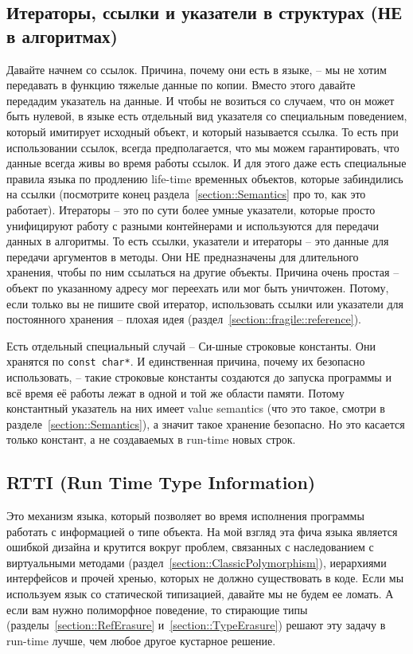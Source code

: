 \subsection{Итераторы, ссылки и указатели в структурах (НЕ в алгоритмах)}

Давайте начнем со ссылок.
Причина, почему они есть в языке, -- мы не хотим передавать в функцию тяжелые данные по копии.
Вместо этого давайте передадим указатель на данные.
И чтобы не возиться со случаем, что он может быть нулевой, в языке есть отдельный вид указателя со специальным поведением, который имитирует исходный объект, и который называется ссылка.
То есть при использовании ссылок, всегда предполагается, что мы можем гарантировать, что данные всегда живы во время работы ссылок.
И для этого даже есть специальные правила языка по продлению life-time временных объектов, которые забиндились на ссылки (посмотрите конец раздела~\ref{section::Semantics} про то, как это работает).
Итераторы -- это по сути более умные указатели, которые просто унифицируют работу с разными контейнерами и используются для передачи данных в алгоритмы.
То есть ссылки, указатели и итераторы -- это данные для передачи аргументов в методы.
Они НЕ предназначены для длительного хранения, чтобы по ним ссылаться на другие объекты.
Причина очень простая -- объект по указанному адресу мог переехать или мог быть уничтожен.
Потому, если только вы не пишите свой итератор, использовать ссылки или указатели для постоянного хранения -- плохая идея (раздел~\ref{section::fragile::reference}).

Есть отдельный специальный случай -- Си-шные строковые константы.
Они хранятся по \verb"const char*".
И единственная причина, почему их безопасно использовать, -- такие строковые константы создаются до запуска программы и всё время её работы лежат в одной и той же области памяти.
Потому константный указатель на них имеет value semantics (что это такое, смотри в разделе~\ref{section::Semantics}), а значит такое хранение безопасно.
Но это касается только констант, а не создаваемых в run-time новых строк.

\subsection{RTTI (Run Time Type Information)}

Это механизм языка, который позволяет во время исполнения программы работать с информацией о типе объекта.
На мой взгляд эта фича языка является ошибкой дизайна и крутится вокруг проблем, связанных с наследованием с виртуальными методами (раздел~\ref{section::ClassicPolymorphism}), иерархиями интерфейсов и прочей хренью, которых не должно существовать в коде.
Если мы используем язык со статической типизацией, давайте мы не будем ее ломать.
А если вам нужно полиморфное поведение, то стирающие типы (разделы~\ref{section::RefErasure} и~\ref{section::TypeErasure}) решают эту задачу в run-time лучше, чем любое другое кустарное решение.
